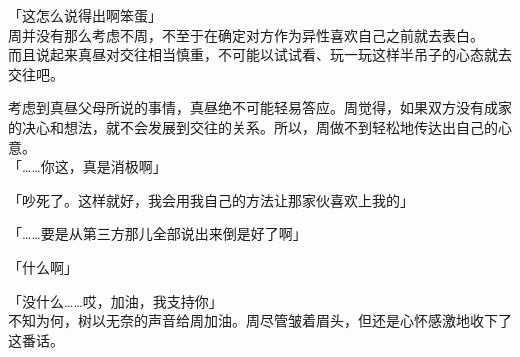「这怎么说得出啊笨蛋」\\

周并没有那么考虑不周，不至于在确定对方作为异性喜欢自己之前就去表白。\\

而且说起来真昼对交往相当慎重，不可能以试试看、玩一玩这样半吊子的心态就去交往吧。

考虑到真昼父母所说的事情，真昼绝不可能轻易答应。周觉得，如果双方没有成家的决心和想法，就不会发展到交往的关系。所以，周做不到轻松地传达出自己的心意。\\

「……你这，真是消极啊」

「吵死了。这样就好，我会用我自己的方法让那家伙喜欢上我的」

「……要是从第三方那儿全部说出来倒是好了啊」

「什么啊」

「没什么……哎，加油，我支持你」\\

不知为何，树以无奈的声音给周加油。周尽管皱着眉头，但还是心怀感激地收下了这番话。
